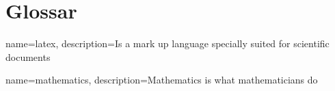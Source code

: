 \chapter*{Glossar}

\makeglossaries
{}
{
name=latex,
description={Is a mark up language specially suited
for scientific documents}
}

{
name=mathematics,
description={Mathematics is what mathematicians do}
}

\printglossaries

